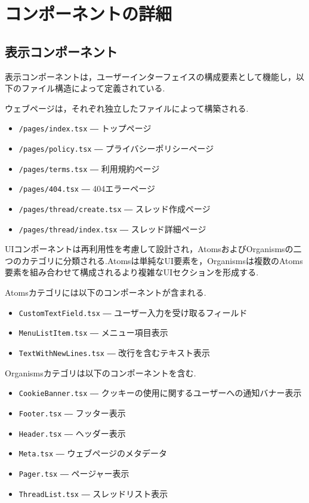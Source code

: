\documentclass[b5paper,12pt,dvipdfmx]{jsreport}
\begin{document}
\section{コンポーネントの詳細}


\subsection*{表示コンポーネント}

表示コンポーネントは，ユーザーインターフェイスの構成要素として機能し，以下のファイル構造によって定義されている.

ウェブページは，それぞれ独立したファイルによって構築される.

\begin{itemize}
\item \texttt{/pages/index.tsx} ― トップページ
\item \texttt{/pages/policy.tsx} ― プライバシーポリシーページ
\item \texttt{/pages/terms.tsx} ― 利用規約ページ
\item \texttt{/pages/404.tsx} ― 404エラーページ
\item \texttt{/pages/thread/create.tsx} ― スレッド作成ページ
\item \texttt{/pages/thread/index.tsx} ― スレッド詳細ページ
\end{itemize}

UIコンポーネントは再利用性を考慮して設計され，AtomsおよびOrganismsの二つのカテゴリに分類される.Atomsは単純なUI要素を，Organismsは複数のAtoms要素を組み合わせて構成されるより複雑なUIセクションを形成する.

Atomsカテゴリには以下のコンポーネントが含まれる.

\begin{itemize}
    \item \texttt{CustomTextField.tsx} ― ユーザー入力を受け取るフィールド
    \item \texttt{MenuListItem.tsx} ― メニュー項目表示
    \item \texttt{TextWithNewLines.tsx} ― 改行を含むテキスト表示
\end{itemize}

Organismsカテゴリは以下のコンポーネントを含む.

\begin{itemize}
    \item \texttt{CookieBanner.tsx} ― クッキーの使用に関するユーザーへの通知バナー表示
    \item \texttt{Footer.tsx} ― フッター表示
    \item \texttt{Header.tsx} ― ヘッダー表示
    \item \texttt{Meta.tsx} ― ウェブページのメタデータ
    \item \texttt{Pager.tsx} ― ページャー表示
    \item \texttt{ThreadList.tsx} ― スレッドリスト表示
\end{itemize}
\end{document}
